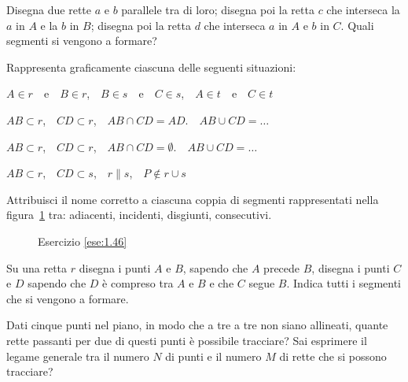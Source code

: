 \begin{esercizio}
\label{ese:1.44}
Disegna due rette $a$ e $b$ parallele tra di loro; disegna poi la 
retta $c$ che interseca la $a$ in $A$ e la $b$ in $B$; disegna poi la 
retta $d$ che interseca $a$ in $A$ e $b$ in $C$. Quali segmenti si 
vengono a formare?
\end{esercizio}

\begin{esercizio}
\label{ese:1.45}
Rappresenta graficamente ciascuna delle seguenti situazioni:
\begin{enumeratea}
\item $A\in r$~~e~~$B\in r$,~~$B\in s$~~e~~$C\in s$,~~$A\in 
t$~~e~~$C\in t$
\item $AB\subset r$,~~$CD\subset r$,~~$AB\cap CD=AD$.~~$AB\cup 
CD=\ldots{}$
\item $AB\subset r$,~~$CD\subset r$,~~$AB\cap CD=\emptyset$.~~$AB\cup 
CD=\ldots{}$
\item $AB\subset r$,~~$CD\subset s$,~~$r\parallel s$,~~$P\notin r\cup 
s$
\end{enumeratea}
\end{esercizio}

\begin{esercizio}
\label{ese:1.46}
Attribuisci il nome corretto a ciascuna coppia di segmenti 
rappresentati nella figura~\ref{fig:ese1.46} tra: adiacenti, 
incidenti, disgiunti, consecutivi.
\end{esercizio}


\begin{inaccessibleblock}
 \begin{figure}[htb]
 \centering
 \caption{Esercizio \ref{ese:1.46}}\label{fig:ese1.46}
\end{figure}
\end{inaccessibleblock}

\begin{esercizio}
\label{ese:1.47}
Su una retta $r$ disegna i punti $A$ e $B$, sapendo che $A$ precede 
$B$, disegna i punti $C$ e $D$ sapendo che $D$ è compreso tra $A$ e 
$B$ e che $C$ segue $B$. Indica tutti i segmenti che si vengono a 
formare.
\end{esercizio}

\begin{esercizio}
\label{ese:1.48}
Dati cinque punti nel piano, in modo che a tre a tre non siano 
allineati, quante rette passanti per due di questi punti è possibile 
tracciare? Sai esprimere il legame generale tra il numero $N$ di 
punti e il numero $M$ di rette che si possono tracciare?
\end{esercizio}

